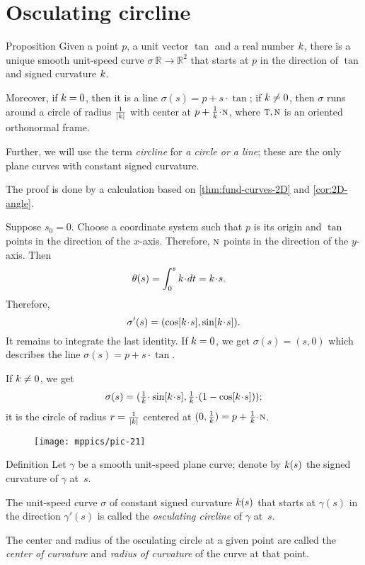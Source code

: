 \section{Osculating circline}

\begin{thm}{Proposition}\label{prop:circline}
Given a point $p$,
a unit vector $\tan$ 
and a real number $k$, there is a unique smooth unit-speed curve $\sigma\:\mathbb{R}\to\mathbb{R}^2$ 
that starts at $p$ in the direction of $\tan$ and signed curvature $k$.

Moreover, if $k=0$, then it is a line $\sigma(s)=p+s\cdot \tan$;
if $k\ne 0$, then $\sigma$ runs around a circle of radius $\tfrac1{|k|}$ with center at $p+\tfrac1\skur\cdot \norm$, where $\text{\sc{t}},\text{\sc{n}}$ is an oriented orthonormal frame.
\end{thm}

Further, we will use the term \emph{circline} for {}\emph{a circle or a line};
these are the only plane curves with constant signed curvature.

The proof is done by a calculation based on \ref{thm:fund-curves-2D} and \ref{cor:2D-angle}.

Suppose $s_0=0$.
Choose a coordinate system such that $p$ is its origin and $\tan$ points in the direction of the $x$-axis.
Therefore, $\text{\sc{n}}$ points in the direction of the $y$-axis.
Then
\begin{align*}\theta(s)&=\int_{0}^s\skur\cdot dt=\skur\cdot s.
\end{align*}
Therefore,
\[\sigma'(s)=(\cos[\skur\cdot s],\sin[\skur\cdot s]).\]
It remains to integrate the last identity.
If $k=0$, we get $\sigma(s)=(s,0)$
which describes the line $\sigma(s)=p+s\cdot \tan$.

If $k\ne 0$, we get
\[\sigma(s)=(\tfrac1\skur\cdot\sin[\skur\cdot s],
\tfrac1\skur\cdot(1-\cos[\skur\cdot s]));\]
it is the circle of radius $r=\tfrac1{|k|}$ centered at $(0,\tfrac1\skur)=p+\tfrac1\skur\cdot\norm$.
\qeds


\begin{wrapfigure}{r}{31 mm}
\vskip-0mm
\centering
\texttt{[image: mppics/pic-21]}
\vskip0mm
\end{wrapfigure}

\begin{thm}{Definition}
Let $\gamma$ be a smooth unit-speed plane curve;
denote by $k(s)$ the signed curvature of $\gamma$ at~$s$.

The unit-speed curve $\sigma$ of constant signed curvature $k(s)$ that starts at $\gamma(s)$ in the direction $\gamma'(s)$ is called the \emph{osculating circline} of $\gamma$ at~$s$.

The center and radius of the osculating circle at a given point are called the \emph{center of curvature} and \emph{radius of curvature} of the curve at that point.
\end{thm}

